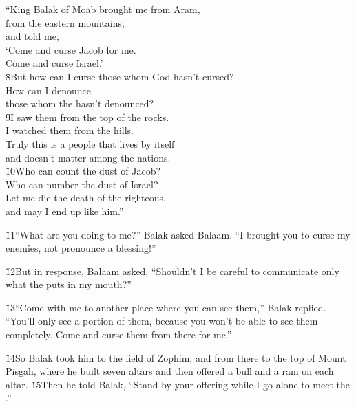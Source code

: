\begin{poetry}
\poeml ``King Balak of Moab brought me from Aram, \\
\poemll    from the eastern mountains, \\
\poemlll       and told me, \\
\poeml `Come and curse Jacob for me. \\
\poemll    Come and curse Israel.' \\
\poeml \v{8}But how can I curse those whom God hasn't cursed? \\
\poemll    How can I denounce \\
\poemlll       those whom the  hasn't denounced? \\
\poeml \v{9}I saw them from the top of the rocks. \\
\poemll    I watched them from the hills. \\
\poeml Truly this is a people that lives by itself \\
\poemll    and doesn't matter among the nations. \\
\poeml \v{10}Who can count the dust of Jacob? \\
\poemll    Who can number the dust of Israel? \\
\poeml Let me die the death of the righteous, \\
\poemll    and may I end up like him.''
\end{poetry}

\v{11}``What are you doing to me?'' Balak asked Balaam. ``I brought you to curse my enemies, not pronounce a blessing!''

\v{12}But in response, Balaam asked, ``Shouldn't I be careful to communicate only what the  puts in my mouth?''

\v{13}``Come with me to another place where you can see them,'' Balak replied. ``You'll only see a portion of them, because you won't be able to see them completely. Come and curse them from there for me.''

\v{14}So Balak took him to the field of Zophim, and from there to the top of Mount Pisgah, where he built seven altars and then offered a bull and a ram on each altar. \v{15}Then he told Balak, ``Stand by your offering while I go alone to meet the .''

